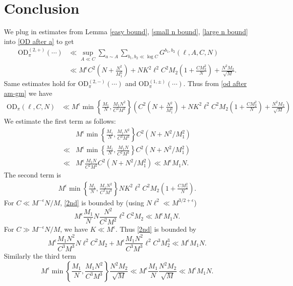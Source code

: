 \documentclass[12pt,a4paper,twoside, reqno]{amsart}
\begin{document}
\section{Conclusion}
We plug in  estimates from Lemma \ref{easy bound}, \ref{small n bound}, \ref{large n bound} into \eqref{OD after a} to get 
\begin{align}
     \mathrm{OD}_{\pi}^{(2, +)}(\cdots)  &\ll  \sup_{A \ll C}  \sum_{a \sim A} \sum_{b_1,b_2 \ll \log C } G_{}^{b_1,b_2}(\ell, A,C,N) \\
     & \ll M^{\epsilon} C^2\left(N+ \frac{N^2}{M_1^2}\right)+ {NK^2 {\ell^2} C^2 M_2}{    }  \left(1 +\frac{C M_2^2}{ N}\right)+\frac{N^2  M_2}{ \sqrt{M}}. 
\end{align}
Same estimates hold for $ \mathrm{OD}_{\pi}^{(2, -)}(\cdots) $ and $ \mathrm{OD}_{\pi}^{(1, \pm)}(\cdots) $. Thus from \eqref{od after am-gm} we have 
\begin{align*}
    \mathrm{OD}_{\pi}(\ell,C,  N) &\ll  M^{\epsilon}\min\left\{\frac{M_1}{{N}}, \frac{M_1N^2}{C^3M^3}\right\} \left(  C^2\left(N+ \frac{N^2}{M_1^2}\right)+ {NK^2 {\ell^2} C^2 M_2}{    }  \left(1 +\frac{C M_2^2}{ N}\right)+\frac{N^2  M_2}{ \sqrt{M}}\right)  
\end{align*}
We estimate the first term as follows:
\begin{align*}
     &  M^{\epsilon}\min\left\{\frac{M_1}{{N}}, \frac{M_1N^2}{C^3M^3}\right\} C^2(N+N^2/M_1^2) \\
     \ll& M^{\epsilon} \min\left\{\frac{M_1}{{N}}, \frac{M_1N}{C^2M^2}\right\} C^2(N+N^2/M_1^2) \\
    \ll&  M^{\epsilon}\frac{M_1N}{C^2M^2} C^2(N+N^2/M_1^2)   \ll M^{\epsilon}M_1N.
\end{align*}
The second term is 
\begin{align}\label{2nd}
    M^{\epsilon}\min\left\{\frac{M_1}{{N}}, \frac{M_1N^2}{C^3M^3}\right\} {NK^2 {\ell^2} C^2 M_2}{    }  \left(1 +\frac{C M_2^2}{ N}\right).
\end{align}
For $C \ll M^{-\epsilon}N/M$, \eqref{2nd} is  bounded by (using $N\ell^2 \ll M^{3/2+\epsilon}$)
$$   M^\epsilon \frac{M_1}{N}N \frac{N^2}{C^2M^2}\ell^2 C^2M_2 \ll M^\epsilon M_1N. $$
For $C \gg M^{-\epsilon}N/M$, we have $K \ll M^\epsilon$. Thus  \eqref{2nd} is  bounded by 
\[ M^\epsilon \frac{M_1N^2}{C^3M^3} N \ell^2C^2M_2+ M^\epsilon \frac{M_1N^2}{C^3M^3}  \ell^2C^3M_2^3  \ll M^{\epsilon}M_1N.  \]
Similarly the third term  
\[ M^{\epsilon}\min\left\{\frac{M_1}{{N}}, \frac{M_1N^2}{C^3M^3}\right\} \frac{N^2M_2}{\sqrt{M}} \ll M^{\epsilon} \frac{M_1}{{N}} \frac{N^2M_2}{\sqrt{M}} \ll M^{\epsilon}M_1N.  \]
\end{document}

